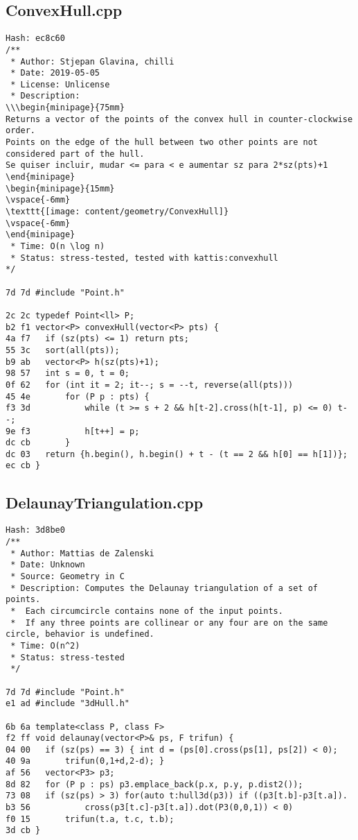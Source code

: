 \documentclass[11pt, a4paper, twoside]{article}
\begin{document}
\subsection{ConvexHull.cpp}
\begin{lstlisting}
Hash: ec8c60
/**
 * Author: Stjepan Glavina, chilli
 * Date: 2019-05-05
 * License: Unlicense
 * Description:
\\\begin{minipage}{75mm}
Returns a vector of the points of the convex hull in counter-clockwise order.
Points on the edge of the hull between two other points are not considered part of the hull.
Se quiser incluir, mudar <= para < e aumentar sz para 2*sz(pts)+1
\end{minipage}
\begin{minipage}{15mm}
\vspace{-6mm}
\texttt{[image: content/geometry/ConvexHull]}
\vspace{-6mm}
\end{minipage}
 * Time: O(n \log n)
 * Status: stress-tested, tested with kattis:convexhull
*/

7d 7d #include "Point.h"

2c 2c typedef Point<ll> P;
b2 f1 vector<P> convexHull(vector<P> pts) {
4a f7 	if (sz(pts) <= 1) return pts;
55 3c 	sort(all(pts));
b9 ab 	vector<P> h(sz(pts)+1);
98 57 	int s = 0, t = 0;
0f 62 	for (int it = 2; it--; s = --t, reverse(all(pts)))
45 4e 		for (P p : pts) {
f3 3d 			while (t >= s + 2 && h[t-2].cross(h[t-1], p) <= 0) t--;
9e f3 			h[t++] = p;
dc cb 		}
dc 03 	return {h.begin(), h.begin() + t - (t == 2 && h[0] == h[1])};
ec cb }
\end{lstlisting}

\subsection{DelaunayTriangulation.cpp}
\begin{lstlisting}
Hash: 3d8be0
/**
 * Author: Mattias de Zalenski
 * Date: Unknown
 * Source: Geometry in C
 * Description: Computes the Delaunay triangulation of a set of points.
 *  Each circumcircle contains none of the input points.
 *  If any three points are collinear or any four are on the same circle, behavior is undefined.
 * Time: O(n^2)
 * Status: stress-tested
 */

7d 7d #include "Point.h"
e1 ad #include "3dHull.h"

6b 6a template<class P, class F>
f2 ff void delaunay(vector<P>& ps, F trifun) {
04 00 	if (sz(ps) == 3) { int d = (ps[0].cross(ps[1], ps[2]) < 0);
40 9a 		trifun(0,1+d,2-d); }
af 56 	vector<P3> p3;
8d 82 	for (P p : ps) p3.emplace_back(p.x, p.y, p.dist2());
73 08 	if (sz(ps) > 3) for(auto t:hull3d(p3)) if ((p3[t.b]-p3[t.a]).
b3 56 			cross(p3[t.c]-p3[t.a]).dot(P3(0,0,1)) < 0)
f0 15 		trifun(t.a, t.c, t.b);
3d cb }
\end{lstlisting}
\end{document}
